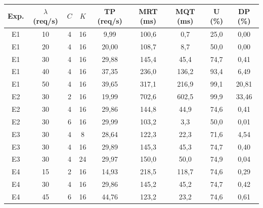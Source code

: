 \begin{tabular}{|c|c|c|c|c|c|c|c|c|}
\hline
\textbf{Exp.} & \textbf{$\lambda$ (req/s)} & \textbf{$C$} & \textbf{$K$} & \textbf{TP (req/s)} & \textbf{MRT (ms)} & \textbf{MQT (ms)} & \textbf{U (\%)} & \textbf{DP (\%)} \\
\hline
E1 & 10 & 4 & 16 & 9,99 & 100,6 & 0,7 & 25,0 & 0,00 \\
E1 & 20 & 4 & 16 & 20,00 & 108,7 & 8,7 & 50,0 & 0,00 \\
E1 & 30 & 4 & 16 & 29,88 & 145,4 & 45,4 & 74,7 & 0,41 \\
E1 & 40 & 4 & 16 & 37,35 & 236,0 & 136,2 & 93,4 & 6,49 \\
E1 & 50 & 4 & 16 & 39,65 & 317,1 & 216,9 & 99,1 & 20,81 \\
E2 & 30 & 2 & 16 & 19,99 & 702,6 & 602,5 & 99,9 & 33,46 \\
E2 & 30 & 4 & 16 & 29,86 & 144,8 & 44,9 & 74,6 & 0,41 \\
E2 & 30 & 6 & 16 & 29,99 & 103,2 & 3,3 & 50,0 & 0,01 \\
E3 & 30 & 4 & 8 & 28,64 & 122,3 & 22,3 & 71,6 & 4,54 \\
E3 & 30 & 4 & 16 & 29,89 & 145,3 & 45,3 & 74,7 & 0,40 \\
E3 & 30 & 4 & 24 & 29,97 & 150,0 & 50,0 & 74,9 & 0,04 \\
E4 & 15 & 2 & 16 & 14,93 & 218,5 & 118,7 & 74,6 & 0,29 \\
E4 & 30 & 4 & 16 & 29,86 & 145,2 & 45,2 & 74,7 & 0,42 \\
E4 & 45 & 6 & 16 & 44,76 & 123,2 & 23,2 & 74,6 & 0,61 \\
\hline
\end{tabular}

